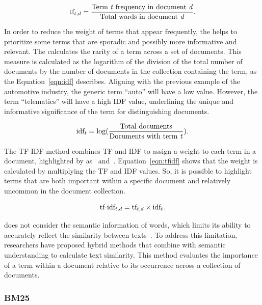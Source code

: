 \begin{equation}
    \textup{tf}_{t,d} = \frac{\text{Term \textit{t} frequency in document \textit{d}}}{\text{Total words in document \textit{d}}}.
    \label{eqn:tf}
\end{equation}

In order to reduce the weight of terms that appear frequently, the {\idf} helps to prioritize some terms that are sporadic and possibly more informative and relevant. The {\idf} calculates the rarity of a term across a set of documents. This measure is calculated as the logarithm of the division of the total number of documents by the number of documents in the collection containing the term, as the Equation~\ref{eqn:idf} describes. Aligning with the previous example of the automotive industry, the generic term ``auto'' will have a low {\idf} value. However, the term ``telematics'' will have a high IDF value, underlining the unique and informative significance of the term for distinguishing documents.

\begin{equation}
    \textup{idf}_{t} = \log(\frac{\text{Total documents}}{\text{Documents with term \textit{t}}}).
    \label{eqn:idf}
\end{equation}

The TF-IDF method combines TF and IDF to assign a weight to each term in a document, highlighted by as~\citet{manning_introduction_2009} and~\citet{lan_research_2022}. Equation~\ref{eqn:tfidf} shows that the weight is calculated by multiplying the TF and IDF values. So, it is possible to highlight terms that are both important within a specific document and relatively uncommon in the document collection.

\begin{equation}
    \textup{tf-idf}_{t,d} = \textup{tf}_{t,d} \times \textup{idf}_{t}.
    \label{eqn:tfidf}
\end{equation}

{\tfidf} does not consider the semantic information of words, which limits its ability to accurately reflect the similarity between texts~\cite{lan_research_2022}. To address this limitation, researchers have proposed hybrid methods that combine {\tfidf} with semantic understanding to calculate text similarity. This {\ir} method evaluates the importance of a term within a document relative to its occurrence across a collection of documents.


\subsubsection{BM25}
\label{bm25}

